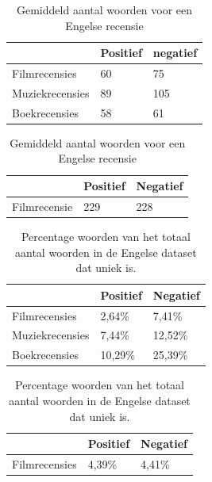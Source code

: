 \begin{table}[h]
\centering
\setlength\tabcolsep{2pt}
\begin{minipage}[t]{0.48\textwidth}
\centering
\begin{tabular}{l|l|l|}
\cline{2-3}
                & Positief & negatief \\ \hline
\multicolumn{1}{|l|}{Filmrecensies}   & 60       & 75       \\ \hline
\multicolumn{1}{|l|}{Muziekrecensies} & 89       & 105      \\ \hline
\multicolumn{1}{|l|}{Boekrecensies}   & 58       & 61    \\ \hline   
\end{tabular}

\caption{Gemiddeld aantal woorden voor een Nederlandse recensie} 
\end{minipage}%
\hfill
\begin{minipage}[t]{0.48\textwidth}
\centering
\begin{tabular}{l|l|l|}
\cline{2-3}
                                   & Positief & Negatief \\ \hline
\multicolumn{1}{|l|}{Filmrecensie} & 229      & 228      \\ \hline
\end{tabular}
\caption{Gemiddeld aantal woorden voor een Engelse recensie}
\end{minipage}
\end{table}

\begin{table}[h]
\centering
\setlength\tabcolsep{2pt}
\begin{minipage}[t]{0.48\textwidth}
\centering
\begin{tabular}{l|l|l|}
\cline{2-3}
                                      & Positief & Negatief \\ \hline
\multicolumn{1}{|l|}{Filmrecensies}   & 2,64\%   & 7,41\%   \\ \hline
\multicolumn{1}{|l|}{Muziekrecensies} & 7,44\%   & 12,52\%  \\ \hline
\multicolumn{1}{|l|}{Boekrecensies}   & 10,29\%  & 25,39\%  \\ \hline
\end{tabular}

\caption{Percentage woorden van het totaal aantal woorden in de Nederlandse dataset dat uniek is.} 
\end{minipage}%
\hfill
\begin{minipage}[t]{0.48\textwidth}
\centering
\begin{tabular}{l|l|l|}
\cline{2-3}
                                    & Positief & Negatief \\ \hline
\multicolumn{1}{|l|}{Filmrecensies} & 4,39\%   & 4,41\%   \\ \hline
\end{tabular}
\caption{Percentage woorden van het totaal aantal woorden in de Engelse dataset dat uniek is.} 
\end{minipage}
\end{table}

